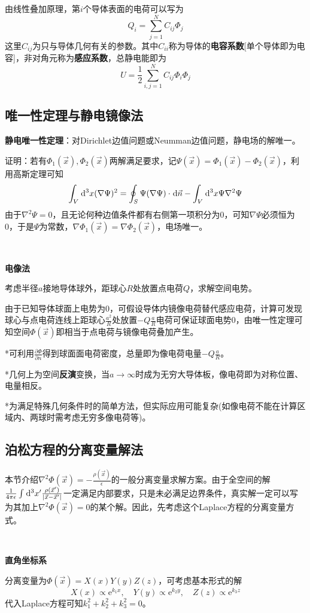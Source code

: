 \documentclass[a4paper,UTF8,fontset=windows]{ctexart}
\newcommand*{\dr}{\hspace{0.07em}\mathrm{d}}
\newcommand*{\er}{\mathrm{e}}
\newcommand*{\vns}{\vec{n}}
\newcommand*{\vx}{\vec{x}}
\newcommand*{\pt}[2][t]{\frac{\partial #2}{\partial #1}}
\begin{document}
由线性叠加原理，第$i$个导体表面的电荷可以写为
$$Q_i=\sum_{j=1}^NC_{ij}\Phi_j$$
这里$C_{ij}$为只与导体几何有关的参数。其中$C_{ii}$称为导体的\textbf{电容系数}[单个导体即为电容]，非对角元称为\textbf{感应系数}，总静电能即为
$$U=\frac{1}{2}\sum_{i,j=1}^NC_{ij}\Phi_i\Phi_j$$

\subsection{唯一性定理与静电镜像法}
\textbf{静电唯一性定理}：对Dirichlet边值问题或Neumman边值问题，静电场的解唯一。

证明：若有$\Phi_1(\vx),\Phi_2(\vx)$两解满足要求，记$\Psi(\vx)=\Phi_1(\vx)-\Phi_2(\vx)$，利用高斯定理可知
$$\int_V\dr^3x(\nabla\Psi)^2=\oint_S\Psi(\nabla\Psi)\cdot\dr\vns-\int_V\dr^3x\Psi\nabla^2\Psi$$
由于$\nabla^2\Psi=0$，且无论何种边值条件都有右侧第一项积分为0，可知$\nabla\Psi$必须恒为0，于是$\Psi$为常数，$\nabla\Phi_1(\vx)=\nabla\Phi_2(\vx)$，电场唯一。

\

\textbf{电像法}

考虑半径$a$接地导体球外，距球心$R$处放置点电荷$Q$，求解空间电势。

由于已知导体球面上电势为0，可假设导体内镜像电荷替代感应电荷，计算可发现球心与点电荷连线上距球心$\frac{a^2}{R}$处放置$-Q\frac{a}{R}$电荷可保证球面电势0，由唯一性定理可知空间$\Phi(\vx)$即相当于点电荷与镜像电荷叠加产生。

*可利用$\pt[n]{\Phi}$得到球面面电荷密度，总量即为像电荷电量$-Q\frac{a}{R}$。

*几何上为空间\textbf{反演}变换，当$a\to\infty$时成为无穷大导体板，像电荷即为对称位置、电量相反。

*为满足特殊几何条件时的简单方法，但实际应用可能复杂(如像电荷不能在计算区域内、两球时需考虑无穷多像电荷等)。

\subsection{泊松方程的分离变量解法}
本节介绍$\nabla^2\Phi(\vx)=-\frac{\rho(\vx)}{\epsilon}$的一般分离变量求解方案。由于全空间的解$\frac{1}{4\pi\epsilon}\int\dr^3x'\frac{\rho(\vx')}{|\vx-\vx'|}$一定满足内部要求，只是未必满足边界条件，真实解一定可以写为其加上$\nabla^2\Phi(\vx)=0$的某个解。因此，先考虑这个Laplace方程的分离变量方式。

\

\textbf{直角坐标系}

分离变量为$\Phi(\vx)=X(x)Y(y)Z(z)$，可考虑基本形式的解
$$X(x)\propto\er^{k_1x},\quad Y(y)\propto\er^{k_2y},\quad Z(z)\propto\er^{k_3z}$$
代入Laplace方程可知$k_1^2+k_2^2+k_3^2=0$。
\end{document}
